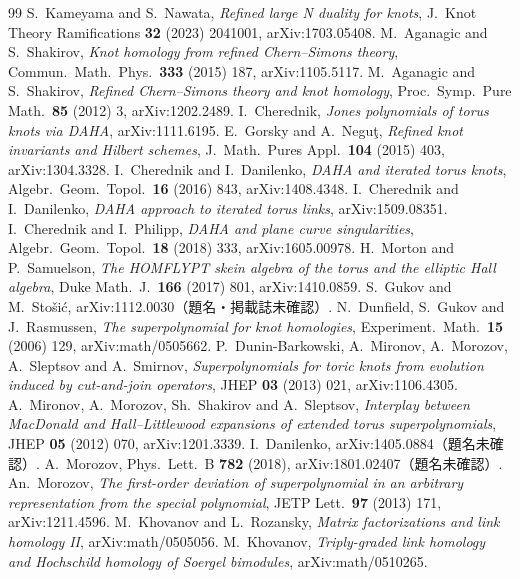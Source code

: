 \documentclass[11pt,a4paper]{ltjsarticle}
\theoremstyle{definition}
\theoremstyle{remark}
\begin{document}
\begin{thebibliography}{99}
 S.~Kameyama and S.~Nawata, \emph{Refined large N duality for knots}, J.~Knot Theory Ramifications \textbf{32} (2023) 2041001, arXiv:1703.05408.
 M.~Aganagic and S.~Shakirov, \emph{Knot homology from refined Chern--Simons theory}, Commun.~Math.~Phys.\ \textbf{333} (2015) 187, arXiv:1105.5117.
 M.~Aganagic and S.~Shakirov, \emph{Refined Chern--Simons theory and knot homology}, Proc.~Symp.~Pure Math.\ \textbf{85} (2012) 3, arXiv:1202.2489.
 I.~Cherednik, \emph{Jones polynomials of torus knots via DAHA}, arXiv:1111.6195.
 E.~Gorsky and A.~Neguţ, \emph{Refined knot invariants and Hilbert schemes}, J.~Math.~Pures Appl.\ \textbf{104} (2015) 403, arXiv:1304.3328.
 I.~Cherednik and I.~Danilenko, \emph{DAHA and iterated torus knots}, Algebr.~Geom.~Topol.\ \textbf{16} (2016) 843, arXiv:1408.4348.
 I.~Cherednik and I.~Danilenko, \emph{DAHA approach to iterated torus links}, arXiv:1509.08351.
 I.~Cherednik and I.~Philipp, \emph{DAHA and plane curve singularities}, Algebr.~Geom.~Topol.\ \textbf{18} (2018) 333, arXiv:1605.00978.
 H.~Morton and P.~Samuelson, \emph{The HOMFLYPT skein algebra of the torus and the elliptic Hall algebra}, Duke Math.~J.\ \textbf{166} (2017) 801, arXiv:1410.0859.
 S.~Gukov and M.~Stošić, arXiv:1112.0030（題名・掲載誌未確認）.
 N.~Dunfield, S.~Gukov and J.~Rasmussen, \emph{The superpolynomial for knot homologies}, Experiment.~Math.\ \textbf{15} (2006) 129, arXiv:math/0505662.
 P.~Dunin-Barkowski, A.~Mironov, A.~Morozov, A.~Sleptsov and A.~Smirnov, \emph{Superpolynomials for toric knots from evolution induced by cut-and-join operators}, JHEP \textbf{03} (2013) 021, arXiv:1106.4305.
 A.~Mironov, A.~Morozov, Sh.~Shakirov and A.~Sleptsov, \emph{Interplay between MacDonald and Hall--Littlewood expansions of extended torus superpolynomials}, JHEP \textbf{05} (2012) 070, arXiv:1201.3339.
 I.~Danilenko, arXiv:1405.0884（題名未確認）.
 A.~Morozov, Phys.~Lett.~B \textbf{782} (2018), arXiv:1801.02407（題名未確認）.
 An.~Morozov, \emph{The first-order deviation of superpolynomial in an arbitrary representation from the special polynomial}, JETP Lett.\ \textbf{97} (2013) 171, arXiv:1211.4596.
 M.~Khovanov and L.~Rozansky, \emph{Matrix factorizations and link homology II}, arXiv:math/0505056.
 M.~Khovanov, \emph{Triply-graded link homology and Hochschild homology of Soergel bimodules}, arXiv:math/0510265.

\end{thebibliography}
\end{document}
